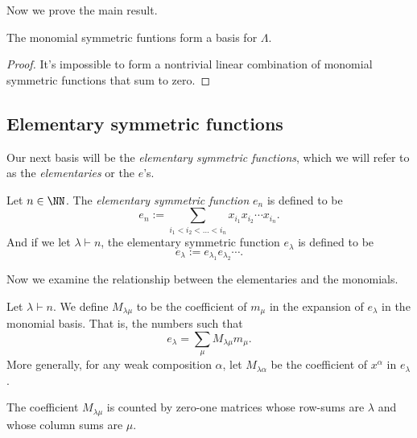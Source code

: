 \documentclass{article}
\begin{document}
Now we prove the main result. 

\begin{theorem}
    The monomial symmetric funtions form a basis for $\Lambda$.
\end{theorem}

\begin{proof}
    It's impossible to form a nontrivial linear combination of monomial symmetric functions that sum to zero.
\end{proof}

\subsection{Elementary symmetric functions}

Our next basis will be the \textit{elementary symmetric functions}, which we will refer to as the \textit{elementaries} or the $e$'s.

\begin{definition}
    Let $n\in\NN$. The \textit{elementary symmetric function} $e_n$ is defined to be
    \[
        e_n := \sum_{i_1<i_2<\ldots<i_n} x_{i_1}x_{i_2}\cdots x_{i_n}.
    \]
    And if we let $\lambda \vdash n$, the elementary symmetric function $e_\lambda$ is defined to be
    \[
        e_\lambda := e_{\lambda_1}e_{\lambda_2}\cdots.
    \]
\end{definition}

Now we examine the relationship between the elementaries and the monomials.

\begin{definition}
    Let $\lambda \vdash n$. We define $M_{\lambda\mu}$ to be the coefficient of $m_\mu$ in the expansion of $e_\lambda$ in the monomial basis. That is, the numbers such that
    \[
        e_\lambda = \sum_\mu M_{\lambda\mu} m_\mu.
    \]
    More generally, for any weak composition $\alpha$, let $M_{\lambda\alpha}$ be the coefficient of $x^\alpha$ in $e_\lambda$.
\end{definition}

\begin{theorem}
    The coefficient $M_{\lambda\mu}$ is counted by zero-one matrices whose row-sums are $\lambda$ and whose column sums are $\mu$.
\end{theorem}
\end{document}
